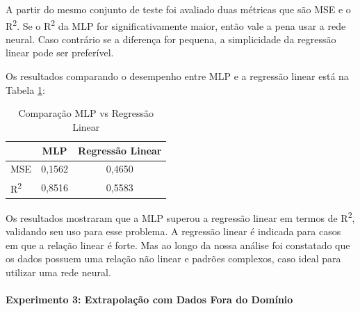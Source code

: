 \documentclass[12pt,a4paper,oneside]{report}
\newcommand{\tab}[1]{Tabela \ref{#1}}
\begin{document}
	A partir do mesmo conjunto de teste foi avaliado duas métricas que são MSE e o R\textsuperscript{2}. Se o R\textsuperscript{2} da MLP for significativamente maior, então vale a pena usar a rede neural. Caso contrário se a diferença for pequena, a simplicidade da regressão linear pode ser preferível.
	
	Os resultados comparando o desempenho entre MLP e a regressão linear está na \tab{tab:mlp_vs_reg_lin}:
	
	\begin{table}[H]
		\centering
		\caption{Comparação MLP vs Regressão Linear}
		\label{tab:mlp_vs_reg_lin}
		\begin{tabular}{l c c}
			\toprule
			& \textbf{MLP} & \textbf{Regressão Linear} \\
			\midrule
			MSE         & 0,1562 & 0,4650\\
			R\textsuperscript{2}    &  0,8516 & 0,5583   \\
			\bottomrule
		\end{tabular}
	\end{table}
	
	Os resultados mostraram que a MLP superou a regress\~ao linear em termos de R\textsuperscript{2}, validando seu uso para esse problema. A regressão linear é indicada para casos em que a relação linear é forte. Mas ao longo da nossa análise foi constatado que os dados possuem uma relação não linear e padrões complexos, caso ideal para utilizar uma rede neural.
	
	\paragraph{Experimento 3: Extrapola\c{c}\~ao com Dados Fora do Domínio}
	
\end{document}
